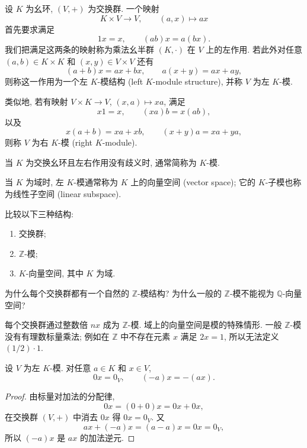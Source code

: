 \documentclass[usesamecnt, thmcnt=section, lang=cn, newtx, 10pt, scheme=chinese]{elegantbook}
\begin{document}
\begin{definition}[左模与右模]\label{def:alg-module}
设 $K$ 为幺环, $(V,+)$ 为交换群. 一个映射
\[
 K\times V\longrightarrow V,
 \qquad
 (a,x)\longmapsto ax
\]
首先要求满足
\[
 1x=x,
 \qquad
 (ab)x=a(bx).
\]
我们把满足这两条的映射称为乘法幺半群 $(K,\cdot)$ 在 $V$ 上的{\color{blue}左作用}. 若此外对任意 $(a,b)\in K\times K$ 和 $(x,y)\in V\times V$ 还有
\[
 (a+b)x=ax+bx,
 \qquad
 a(x+y)=ax+ay,
\]
则称这一作用为一个{\color{blue}左 $K$-模结构 (left $K$-module structure)}, 并称 $V$ 为左 $K$-模.

类似地, 若有映射 $V\times K\to V$, $(x,a)\mapsto xa$, 满足
\[
 x1=x,
 \qquad
 (xa)b=x(ab),
\]
以及
\[
 x(a+b)=xa+xb,
 \qquad
 (x+y)a=xa+ya,
\]
则称 $V$ 为{\color{blue}右 $K$-模 (right $K$-module)}.

当 $K$ 为交换幺环且左右作用没有歧义时, 通常简称为 $K$-模.
\end{definition}

当 $K$ 为域时, 左 $K$-模通常称为 $K$ 上的{\color{blue}向量空间 (vector space)}; 它的 $K$-子模也称为{\color{blue}线性子空间 (linear subspace)}.

\begin{concept}\label{con:alg-module-01}
比较以下三种结构:
\begin{enumerate}[label=\rm(\arabic*)]
  \item 交换群;
  \item $\mathbb Z$-模;
  \item $K$-向量空间, 其中 $K$ 为域.
\end{enumerate}
为什么每个交换群都有一个自然的 $\mathbb Z$-模结构? 为什么一般的 $\mathbb Z$-模不能视为 $\mathbb Q$-向量空间?
\end{concept}

\begin{solution}
每个交换群通过整数倍 $nx$ 成为 $\mathbb Z$-模. 域上的向量空间是模的特殊情形. 一般 $\mathbb Z$-模没有有理数标量乘法; 例如在 $\mathbb Z$ 中不存在元素 $x$ 满足 $2x=1$, 所以无法定义 $(1/2)\cdot1$.
\end{solution}

\begin{proposition}\label{prop:alg-module-zero-minus}
设 $V$ 为左 $K$-模. 对任意 $a\in K$ 和 $x\in V$,
\[
 0x=0_V,
 \qquad
 (-a)x=-(ax).
\]
\end{proposition}

\begin{proof}
由标量对加法的分配律,
\[
 0x=(0+0)x=0x+0x,
\]
在交换群 $(V,+)$ 中消去 $0x$ 得 $0x=0_V$. 又
\[
 ax+(-a)x=(a-a)x=0x=0_V,
\]
所以 $(-a)x$ 是 $ax$ 的加法逆元.
\end{proof}
\end{document}
